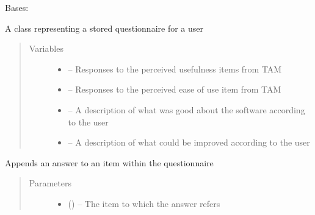\documentclass[letterpaper,10pt,english]{sphinxmanual}
\begin{document}
\begin{fulllineitems}
\label{\detokenize{questionnaire:questionnaire.Questionnaire}}
Bases: 

A class representing a stored questionnaire for a user
\begin{quote}\begin{description}
\item[{Variables}] \leavevmode\begin{itemize}
\item {} 
 -- Responses to the perceived usefulness items from TAM

\item {} 
 -- Responses to the perceived ease of use item from TAM

\item {} 
 -- A description of what was good about the software according to the user

\item {} 
 -- A description of what could be improved according to the user

\end{itemize}

\end{description}\end{quote}

\begin{fulllineitems}
\label{\detokenize{questionnaire:questionnaire.Questionnaire.append_answer}}
Appends an answer to an item within the questionnaire
\begin{quote}\begin{description}
\item[{Parameters}] \leavevmode\begin{itemize}
\item {} 
 ({\hyperref[\detokenize{questionnaire_item:questionnaire_item.QuestionnaireItem}]{}}) -- The item to which the answer refers


\end{itemize}
\end{description}
\end{quote}
\end{fulllineitems}
\end{fulllineitems}
\end{document}
